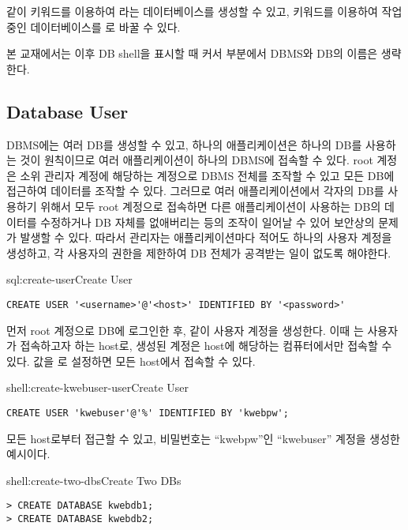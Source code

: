 \와 같이  키워드를 이용하여 라는 데이터베이스를 생성할 수 있고,  키워드를 이용하여 작업 중인 데이터베이스를 로 바꿀 수 있다.

본 교재에서는 이후 DB shell을 표시할 때 커서 부분에서 DBMS와 DB의 이름은 생략한다.

\subsection*{Database User}

DBMS에는 여러 DB를 생성할 수 있고, 하나의 애플리케이션은 하나의 DB를 사용하는 것이 원칙이므로 여러 애플리케이션이 하나의 DBMS에 접속할 수 있다. root 계정은 소위 관리자 계정에 해당하는 계정으로 DBMS 전체를 조작할 수 있고 모든 DB에 접근하여 데이터를 조작할 수 있다. 그러므로 여러 애플리케이션에서 각자의 DB를 사용하기 위해서 모두 root 계정으로 접속하면 다른 애플리케이션이 사용하는 DB의 데이터를 수정하거나 DB 자체를 없애버리는 등의 조작이 일어날 수 있어 보안상의 문제가 발생할 수 있다. 따라서 관리자는 애플리케이션마다 적어도 하나의 사용자 계정을 생성하고, 각 사용자의 권한을 제한하여 DB 전체가 공격받는 일이 없도록 해야한다.

\begin{sqlenv}{sql:create-user}{Create User}\begin{verbatim}
CREATE USER '<username>'@'<host>' IDENTIFIED BY '<password>'
\end{verbatim}
\end{sqlenv}

먼저 root 계정으로 DB에 로그인한 후, \과 같이 사용자 계정을 생성한다. 이때 는 사용자가 접속하고자 하는 host로, 생성된 계정은 host에 해당하는 컴퓨터에서만 접속할 수 있다.  값을 \cd{\%}로 설정하면 모든 host에서 접속할 수 있다.

\begin{shellenv}{shell:create-kwebuser-user}{Create  User}\begin{verbatim}
CREATE USER 'kwebuser'@'%' IDENTIFIED BY 'kwebpw';
\end{verbatim}
\end{shellenv}

\는 모든 host로부터 접근할 수 있고, 비밀번호는 ``kwebpw''인 ``kwebuser'' 계정을 생성한 예시이다.

\begin{shellenv}{shell:create-two-dbs}{Create Two DBs}\begin{verbatim}
> CREATE DATABASE kwebdb1;
> CREATE DATABASE kwebdb2;
\end{verbatim}
\end{shellenv}

